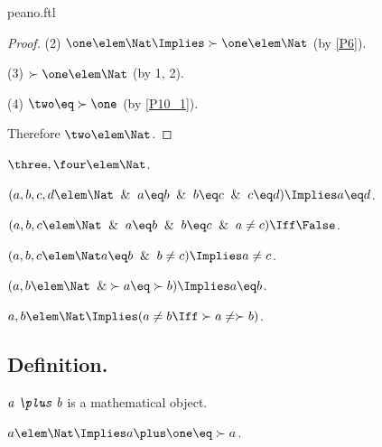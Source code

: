 \documentclass{article}
\begin{document}
\begin{smodule}{peano.ftl}
\begin{forthel}
\begin{proof}
    (2) $\one \elem \Nat \Implies \succ{\one} \elem \Nat$ (by \ref{P6}).

    (3) $\succ{\one} \elem \Nat$ (by 1, 2).

    (4) $\two \eq \succ{\one}$ (by \ref{P10_1}).

    Therefore $\two \elem \Nat$.
  \end{proof}

  \begin{theorem*}[title=12,id=P12]
    $\three,\four \elem \Nat$.
  \end{theorem*}

  \begin{theorem*}[title=13,id=P13]
    $(a,b,c,d \elem \Nat \And a \eq b \And b \eq c \And c \eq d) \Implies a \eq d$.
  \end{theorem*}

  \begin{theorem*}[title=14,id=P14]
    $(a,b,c \elem \Nat \And a \eq b \And b \eq c \And a \neq c) \Iff \False$.
  \end{theorem*}

  \begin{theorem*}[title=15,id=P15]
    $(a,b,c \elem \Nat a \eq b \And b \neq c) \Implies a \neq c$.
  \end{theorem*}

  \begin{theorem*}[title=16,id=P16]
    $(a,b \elem \Nat \And \succ{a} \eq \succ{b}) \Implies a \eq b$.
  \end{theorem*}

  \begin{theorem*}[title=17,id=P17]
    $a,b \elem \Nat \Implies (a \neq b \Iff \succ{a} \neq \succ{b})$.
  \end{theorem*}
\end{forthel}


\subsection{Definition.}

\begin{forthel}
  \begin{signature*}
    $\emph{a \plus b}$ is a mathematical object.
  \end{signature*}

  \begin{axiom*}
    $a \elem \Nat \Implies a \plus \one \eq \succ{a}$.
  \end{axiom*}


\end{forthel}
\end{smodule}
\end{document}
